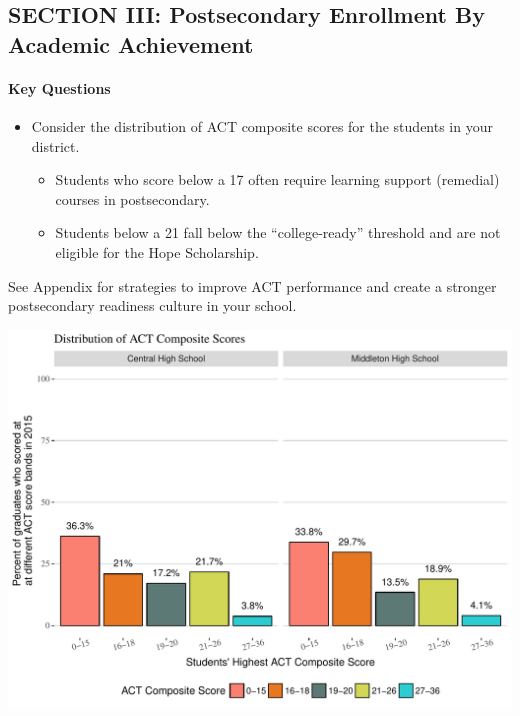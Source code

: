 \documentclass[11pt,]{article}
\providecommand{\tightlist}{%
  \setlength{\itemsep}{0pt}\setlength{\parskip}{0pt}}
\let\oldparagraph\paragraph
\renewcommand{\paragraph}[1]{\oldparagraph{#1}\mbox{}}
\begin{document}
\newpage

\subsection{SECTION III: Postsecondary Enrollment By Academic
Achievement}\label{section-iii-postsecondary-enrollment-by-academic-achievement}

\paragraph{Key Questions}\label{key-questions}

\begin{itemize}
\tightlist
\item
  Consider the distribution of ACT composite scores for the students in
  your district.

  \begin{itemize}
  \tightlist
  \item
    Students who score below a 17 often require learning support
    (remedial) courses in postsecondary.
  \item
    Students below a 21 fall below the ``college-ready'' threshold and
    are not eligible for the Hope Scholarship.
  \end{itemize}
\end{itemize}

See Appendix for strategies to improve ACT performance and create a
stronger postsecondary readiness culture in your school.

\includegraphics{20170419_PSWRR_files/figure-latex/ACT_distribution-1.pdf}
\end{document}
